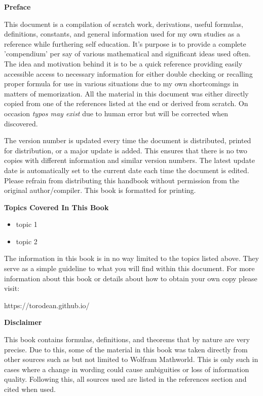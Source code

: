 \begin{center}
	\textbf{Preface}
\end{center}

This document is a compilation of scratch work, derivations, useful formulas, definitions, constants, and general information used for my own studies as a reference while furthering self education. It's purpose is to provide a complete 'compendium' per say of various mathematical and significant ideas used often. The idea and motivation behind it is to be a quick reference providing easily accessible access to necessary information for either double checking or recalling proper formula for use in various situations due to my own shortcomings in matters of memorization. All the material in this document was either directly copied from one of the references listed at the end or derived from scratch. On occasion \textit{typos may exist} due to human error but will be corrected when discovered.
	
The version number is updated every time the document is distributed, printed for distribution, or a major update is added. This ensures that there is no two copies with different information and similar version numbers. The latest update date is automatically set to the current date each time the document is edited. Please refrain from distributing this handbook without permission from the original author/compiler. This book is formatted for printing.

\begin{center}
	\textbf{Topics Covered In This Book}
\end{center}

\begin{multicols}{2}
\begin{itemize}
	\item topic 1
	\item topic 2
\end{itemize} 
\end{multicols}

The information in this book is in no way limited to the topics listed above. They serve as a simple guideline to what you will find within this document. For more information about this book or details about how to obtain your own copy please visit:
\begin{center}
	https://torodean.github.io/
\end{center}
\begin{center}
	\textbf{Disclaimer}
\end{center}

This book contains formulas, definitions, and theorems that by nature are very precise. Due to this, some of the material in this book was taken directly from other sources such as but not limited to Wolfram Mathworld. This is only such in cases where a change in wording could cause ambiguities or loss of information quality.  Following this, all sources used are listed in the references section and cited when used.
